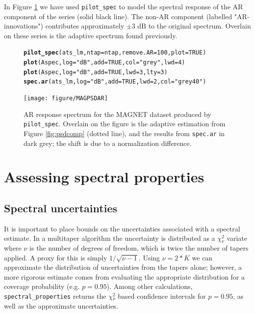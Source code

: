 \documentclass[10pt]{article}\usepackage[]{graphicx}\usepackage[]{color}
\makeatletter
\newcommand{\hlnum}[1]{\textcolor[rgb]{0.686,0.059,0.569}{#1}}%
\newcommand{\hlstr}[1]{\textcolor[rgb]{0.192,0.494,0.8}{#1}}%
\newcommand{\hlstd}[1]{\textcolor[rgb]{0.345,0.345,0.345}{#1}}%
\newcommand{\hlkwc}[1]{\textcolor[rgb]{0.333,0.667,0.333}{#1}}%
\newcommand{\hlkwd}[1]{\textcolor[rgb]{0.737,0.353,0.396}{\textbf{#1}}}%
\newenvironment{kframe}{%
 \def\at@end@of@kframe{}%
 \ifinner\ifhmode%
  \def\at@end@of@kframe{\end{minipage}}%
  \begin{minipage}{\columnwidth}%
 \fi\fi%
 \def\FrameCommand##1{\hskip\@totalleftmargin \hskip-\fboxsep
 \colorbox{shadecolor}{##1}\hskip-\fboxsep
     \hskip-\linewidth \hskip-\@totalleftmargin \hskip\columnwidth}%
 \MakeFramed {\advance\hsize-\width
   \@totalleftmargin\z@ \linewidth\hsize
   \@setminipage}}%
 {\par\unskip\endMakeFramed%
 \at@end@of@kframe}
\newenvironment{knitrout}{}{} %
\newcommand{\Rcmd}[1]{\texttt{#1}}
\makeatother
\begin{document}
In Figure \ref{fig:arspecvar} we have used \Rcmd{pilot\_spec} to 
model the spectral response of the AR component of the series (solid
black line).
The non-AR component (labelled "AR-innovations")
contributes approximately $\pm 3$ dB to the original spectrum.
Overlain on these series is the adaptive spectrum found previously.

\begin{figure}[htb!]
\begin{center}
\begin{knitrout}
\color{fgcolor}\begin{kframe}
\begin{alltt}
\hlkwd{pilot_spec}\hlstd{(ats_lm,} \hlkwc{ntap}\hlstd{=ntap,} \hlkwc{remove.AR}\hlstd{=}\hlnum{100}\hlstd{,} \hlkwc{plot}\hlstd{=}\hlnum{TRUE}\hlstd{)}
\hlkwd{plot}\hlstd{(Aspec,} \hlkwc{log}\hlstd{=}\hlstr{"dB"}\hlstd{,} \hlkwc{add}\hlstd{=}\hlnum{TRUE}\hlstd{,} \hlkwc{col}\hlstd{=}\hlstr{"grey"}\hlstd{,} \hlkwc{lwd}\hlstd{=}\hlnum{4}\hlstd{)}
\hlkwd{plot}\hlstd{(Aspec,} \hlkwc{log}\hlstd{=}\hlstr{"dB"}\hlstd{,} \hlkwc{add}\hlstd{=}\hlnum{TRUE}\hlstd{,} \hlkwc{lwd}\hlstd{=}\hlnum{3}\hlstd{,} \hlkwc{lty}\hlstd{=}\hlnum{3}\hlstd{)}
\hlkwd{spec.ar}\hlstd{(ats_lm,} \hlkwc{log}\hlstd{=}\hlstr{"dB"}\hlstd{,} \hlkwc{add}\hlstd{=}\hlnum{TRUE}\hlstd{,} \hlkwc{lwd}\hlstd{=}\hlnum{2}\hlstd{,} \hlkwc{col}\hlstd{=}\hlstr{"grey40"}\hlstd{)}
\end{alltt}
\end{kframe}
\texttt{[image: figure/MAGPSDAR]} 

\end{knitrout}
\caption{AR response spectrum for the MAGNET dataset produced by 
\Rcmd{pilot\_spec}. Overlain on the figure is the adaptive estimation 
from Figure \ref{fig:psdcomp} (dotted line),
and the results from \Rcmd{spec.ar} in dark grey; the shift is due to a
normalization difference.}
\label{fig:arspecvar}
\end{center}
\end{figure}

\section{Assessing spectral properties}
\subsection{Spectral uncertainties}
It is important to place bounds on the uncertainties associated
with a spectral estimate.
In a multitaper algorithm the uncertainty is distributed as
a $\chi{}_{\nu}^2$ variate where $\nu$ is
the number of degrees of freedom, which is twice the
number of tapers applied.
A proxy for this is simply $1/\sqrt{\nu - 1}$.
Using $\nu = 2*K$ we can approximate the distribution
of uncertainties from the tapers alone; however, a more
rigorous estimate comes from evaluating the appropriate 
distribution  for a coverage probability (e.g. $p=0.95$).
Among other calculations, \Rcmd{spectral\_properties} returns the 
$\chi{}_{\nu}^2$ based confidence intervals for $p=0.95$, as well as the
approximate uncertainties.  
\end{document}

